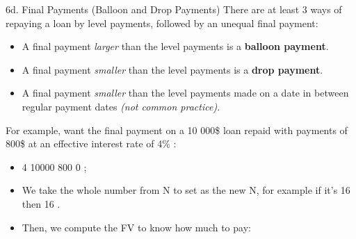 \begin{CHPT_SUMM_AUTO}[label = {L.-6d}]{6d. Final Payments (Balloon and Drop Payments)}
There are at least 3 ways of repaying a loan by level payments, followed by an unequal final payment:
\begin{itemize}
	\item	A final payment \textit{larger} than the level payments is a \textbf{balloon payment}.
	\item	A final payment \textit{smaller} than the level payments is a \textbf{drop payment}.
	\item	A final payment \textit{smaller} than the level payments made on a date in between regular payment dates \textit{(not common practice)}.
\end{itemize}


For example, want the final payment on a 10 000\$ loan repaid with payments of 800\$ at an effective interest rate of 4\% :
\begin{itemize}
	\item	4  10000 \calc{+|-} 800 0   ;
	\item	We take the whole number from N to set as the new N, for example if it's 16 then 16 .
	\item	Then, we compute the FV to know how much to pay:  
\end{itemize}
\end{CHPT_SUMM_AUTO}
